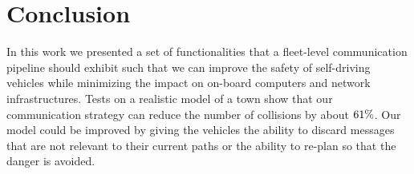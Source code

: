 \section{Conclusion}
In this work we presented a set of functionalities that a fleet-level communication pipeline should exhibit
such that we can improve the safety of self-driving vehicles while minimizing the impact on on-board computers
and network infrastructures.
Tests on a realistic model of a town show that our communication strategy can reduce the number of
collisions by about $\collision_ratio_reduction_perc\%$.
Our model could be improved by giving the vehicles the ability to discard messages that are not relevant
to their current paths or the ability to re-plan so that the danger is avoided.

